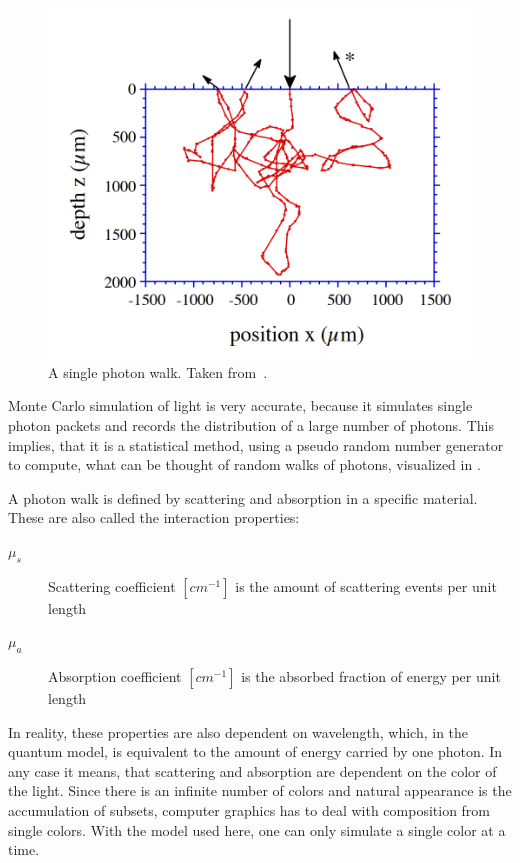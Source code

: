 \documentclass[]{article}
\begin{document}
\begin{figure}[ht!]
	\includegraphics[width=\linewidth]{img/trajectory.png}
	\caption{A single photon walk. Taken from~\cite{wang1992monte}.}
	\label{trajectory}
\end{figure}

Monte Carlo simulation of light is very accurate, because it simulates single photon packets and records the distribution of a large number of photons. This implies, that it is a statistical method, using a pseudo random number generator to compute, what can be thought of random walks of photons, visualized in .

A photon walk is defined by scattering and absorption in a specific material. These are also called the interaction properties:

\begin{description}
	\item[$\mu_s$] Scattering coefficient $[cm^{-1}]$ is the amount of scattering events per unit length
	\item[$\mu_a$] Absorption coefficient $[cm^{-1}]$ is the absorbed fraction of energy per unit length
\end{description}

In reality, these properties are also dependent on wavelength, which, in the quantum model, is equivalent to the amount of energy carried by one photon. In any case it means, that scattering and absorption are dependent on the color of the light. Since there is an infinite number of colors and natural appearance is the accumulation of subsets, computer graphics has to deal with composition from single colors. With the model used here, one can only simulate a single color at a time.
\end{document}
